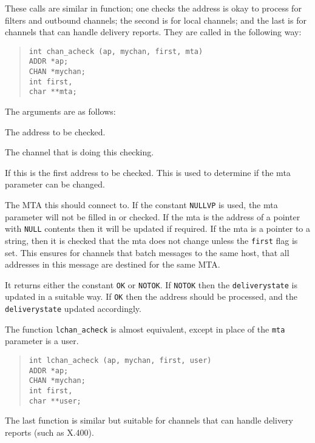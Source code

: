These calls are similar in function; one checks the address is okay
to process for filters and outbound channels; the second is for local
channels; and the last is for channels that can handle delivery reports.
They are called in the following way:

\begin{quote}\small\begin{verbatim}
int chan_acheck (ap, mychan, first, mta)
ADDR *ap;
CHAN *mychan;
int first,
char **mta;
\end{verbatim}\end{quote}

The arguments are as follows:
\begin{describe}
\item[\verb|ap|:] The address to be checked.
\item[\verb|mychan|:] The channel that is doing this checking.
\item[\verb|first|:] If this is the first address to be checked. This
is used to determine if the mta parameter can be changed.
\item[\verb|mta|:] The MTA this should connect to. If the constant
\verb|NULLVP| is used, the mta parameter will not be filled in or
checked. If the mta is the address of a pointer with \verb|NULL|
contents then it will be updated if required. If the mta is a pointer
to a string, then it is checked that the mta does not change unless
the \verb|first| flag is set. This ensures for channels that batch
messages to the same host, that all addresses in this message are
destined for the same MTA.
\end{describe}
It returns either the constant \verb|OK| or \verb|NOTOK|. If
\verb|NOTOK| then the \verb|deliverystate| is updated in a suitable way.
If \verb|OK| then the address should be processed, and the
\verb|deliverystate| updated accordingly.

The function \verb|lchan_acheck| is almost equivalent, except in place
of the \verb|mta| parameter is a user.

\begin{quote}\small\begin{verbatim}
int lchan_acheck (ap, mychan, first, user)
ADDR *ap;
CHAN *mychan;
int first,
char **user;
\end{verbatim}\end{quote}

The last function is similar but suitable for channels that can handle
delivery reports (such as X.400).

